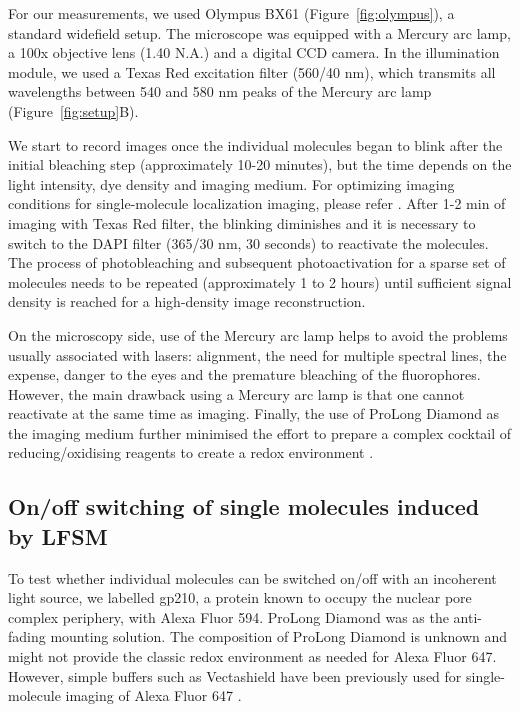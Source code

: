 \documentclass[9pt,twocolumn,twoside]{pnas-new}
\begin{document}
For our measurements, we used Olympus BX61 (Figure~\ref{fig:olympus}), a standard widefield setup. The microscope was equipped with a Mercury arc lamp, a 100x objective lens (1.40 N.A.) and a digital CCD camera.  In the illumination module, we used a Texas Red excitation filter (560/40 nm), which transmits all wavelengths between 540 and 580 nm peaks of the Mercury arc lamp (Figure~\ref{fig:setup}B). 

We start to record images once the individual molecules began to blink after the initial bleaching step (approximately 10-20 minutes), but the time depends on the light intensity, dye density and imaging medium. For optimizing imaging conditions for single-molecule localization imaging, please refer \citep{diekmann2020optimizing}.  After 1-2 min of imaging with Texas Red filter, the blinking diminishes and it is necessary to switch to the DAPI filter (365/30 nm, 30 seconds) to reactivate the molecules. The process of photobleaching and subsequent photoactivation for a sparse set of molecules needs to be repeated (approximately 1 to 2 hours) until sufficient signal density is reached for a high-density image reconstruction. 

On the microscopy side, use of the Mercury arc lamp helps to avoid the problems usually associated with lasers: alignment, the need for multiple spectral lines, the expense, danger to the eyes and the premature bleaching of the fluorophores. However, the main drawback using a Mercury arc lamp is that one cannot reactivate at the same time as imaging. Finally, the use of ProLong Diamond as the imaging medium further minimised the effort to prepare a complex cocktail of reducing/oxidising reagents to create a redox environment \citep{heilemann2008subdiffraction,loschberger2012super}.

\subsection*{On/off switching of single molecules induced by LFSM}

To test whether individual molecules can be switched on/off with an incoherent light source, we labelled gp210, a protein known to occupy the nuclear pore complex periphery, with Alexa Fluor 594. ProLong Diamond was as the anti-fading mounting solution. The composition of ProLong Diamond is unknown and might not provide the classic redox environment as needed for Alexa Fluor 647. However, simple buffers such as Vectashield have been previously used for single-molecule imaging of Alexa Fluor 647 \citep{olivier2013simple}. 
\end{document}
